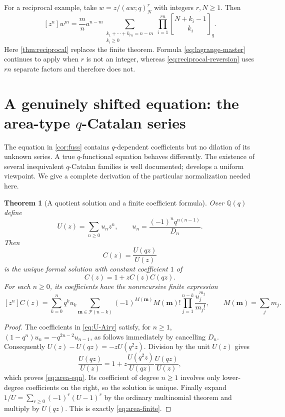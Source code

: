 \documentclass[11pt,a4paper]{article}
\numberwithin{equation}{section}
\newtheorem{theorem}{Theorem}[section]
\theoremstyle{definition}
\theoremstyle{remark}
\newcommand{\Q}{\mathbb Q}
\newcommand{\qb}[2]{\genfrac{[}{]}{0pt}{}{#1}{#2}_{q}}
\newcommand{\poch}[3]{(#1;#2)_{#3}}
\newcommand{\Pcal}{\mathcal P}
\begin{document}
For a reciprocal example, take
$w=z/\poch{aw}qN^r$ with integers $r,N\ge1$. Then
\begin{equation}\label{eq:reciprocal-reversion}
 [z^n]w^m=\frac mn a^{n-m}
 \sum_{\substack{k_1+\cdots+k_{rn}=n-m\\k_i\ge0}}
       \prod_{i=1}^{rn}\qb{N+k_i-1}{k_i}.
\end{equation}
Here \cref{thm:reciprocal} replaces the finite theorem. Formula
\eqref{eq:lagrange-master} continues to apply when $r$ is not an integer, whereas
\eqref{eq:reciprocal-reversion} uses $rn$ separate factors and therefore does not.

\section{A genuinely shifted equation: the area-type \texorpdfstring{$q$}{q}-Catalan series}\label{sec:qcatalan}
The equation in \cref{cor:fuss} contains $q$-dependent coefficients but no dilation
of its unknown series. A true $q$-functional equation behaves differently. The
existence of several inequivalent $q$-Catalan families is well documented;
\cite{Cigler} develops a uniform viewpoint. We give a complete derivation of the
particular normalization needed here.

\begin{theorem}[A quotient solution and a finite coefficient formula]\label{thm:qcat}
Over $\Q(q)$ define
\begin{equation}\label{eq:U-Airy}
 U(z)=\sum_{n\ge0}u_nz^n,\qquad
 u_n=\frac{(-1)^nq^{n(n-1)}}{D_n}.
\end{equation}
Then
\begin{equation}\label{eq:C-Airy}
 C(z)=\frac{U(qz)}{U(z)}
\end{equation}
is the unique formal solution with constant coefficient $1$ of
\begin{equation}\label{eq:area-eqn}
 C(z)=1+zC(z)C(qz).
\end{equation}
For each $n\ge0$, its coefficients have the nonrecursive finite expression
\begin{equation}\label{eq:area-finite}
 [z^n]C(z)=\sum_{k=0}^n q^k u_k
   \sum_{\bm m\in\Pcal(n-k)}
       (-1)^{M(\bm m)}M(\bm m)!
           \prod_{j=1}^{n-k}\frac{u_j^{m_j}}{m_j!},
 \qquad M(\bm m)=\sum_jm_j.
\end{equation}
\end{theorem}
\begin{proof}
The coefficients in \eqref{eq:U-Airy} satisfy, for $n\ge1$,
$(1-q^n)u_n=-q^{2n-2}u_{n-1}$, as follows immediately by cancelling $D_n$.
Consequently $U(z)-U(qz)=-zU(q^2z)$. Division by the unit $U(z)$ gives
\[
 \frac{U(qz)}{U(z)}=1+z\frac{U(q^2z)}{U(qz)}\frac{U(qz)}{U(z)},
\]
which proves \eqref{eq:area-eqn}. Its coefficient of degree $n\ge1$ involves
only lower-degree coefficients on the right, so the solution is unique.
Finally expand $1/U=\sum_{r\ge0}(-1)^r(U-1)^r$ by the ordinary multinomial
theorem and multiply by $U(qz)$. This is exactly \eqref{eq:area-finite}.
\end{proof}
\end{document}
